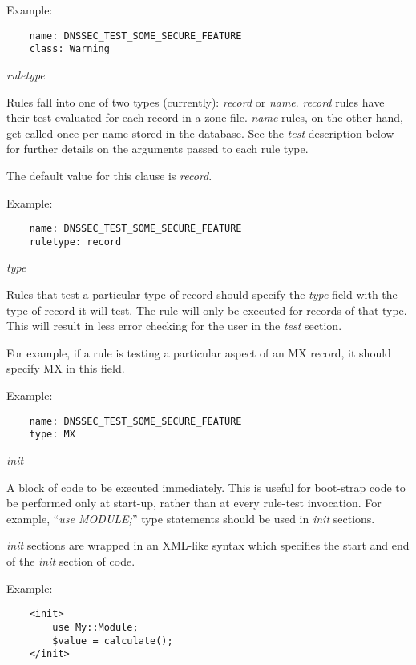 \begin{description}
Example:
\begin{verbatim}
    name: DNSSEC_TEST_SOME_SECURE_FEATURE
    class: Warning
\end{verbatim}

\item {\it ruletype}\verb" "

Rules fall into one of two types (currently): {\it record} or {\it name}.
{\it record} rules have their test evaluated for each record in
a zone file.  {\it name} rules, on the other hand, get called once per
name stored in the database.  See the {\it test} description below for
further details on the arguments passed to each rule type.

The default value for this clause is {\it record}.

Example:

\begin{verbatim}
    name: DNSSEC_TEST_SOME_SECURE_FEATURE
    ruletype: record
\end{verbatim}

\item {\it type}\verb" "

Rules that test a particular type of record should specify the
{\it type} field with the type of record it will test.  The rule
will only be executed for records of that type.  This will result
in less error checking for the user in the {\it test} section.

For example, if a rule is testing a particular aspect of an MX record,
it should specify MX in this field.

Example:

\begin{verbatim}
    name: DNSSEC_TEST_SOME_SECURE_FEATURE
    type: MX
\end{verbatim}

\item {\it init}\verb" "

A block of code to be executed immediately. This is useful for
boot-strap code to be performed only at start-up, rather than
at every rule-test invocation.  For example, ``{\it use MODULE;}''
type statements should be used in {\it init} sections.

{\it init} sections are wrapped in an XML-like syntax which
specifies the start and end of the {\it init} section of code.

Example:

\begin{verbatim}
    <init>
        use My::Module;
        $value = calculate();
    </init>
\end{verbatim}


\end{description}
